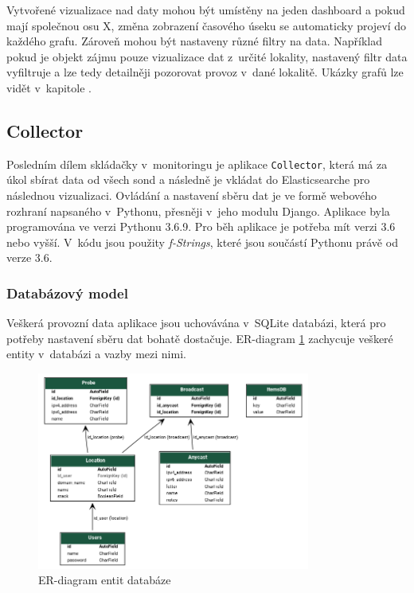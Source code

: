\documentclass[thesis=M,czech]{src/FITthesis}[2019/12/23]
\begin{document}
Vytvořené vizualizace nad daty mohou být umístěny na jeden dashboard a pokud mají společnou osu X, změna zobrazení časového úseku se automaticky projeví do každého grafu. Zároveň mohou být nastaveny různé filtry na data. Například pokud je objekt zájmu pouze vizualizace dat z~určité lokality, nastavený filtr data vyfiltruje a lze tedy detailněji pozorovat provoz v~dané lokalitě. Ukázky grafů lze vidět v~kapitole .


\subsection{Collector}
Posledním dílem skládačky v~monitoringu je aplikace \texttt{Collector}, která má za úkol sbírat data od všech sond a následně je vkládat do Elasticsearche pro následnou vizualizaci. Ovládání a nastavení sběru dat je ve formě webového rozhraní napsaného v~Pythonu, přesněji v~jeho modulu Django. Aplikace byla programována ve verzi Pythonu 3.6.9. Pro běh aplikace je potřeba mít verzi 3.6 nebo vyšší. V~kódu jsou použity \textit{f-Strings}, které jsou součástí Pythonu právě od verze 3.6. 	
\subsubsection{Databázový model}
Veškerá provozní data aplikace jsou uchovávána v~SQLite databázi, která pro potřeby nastavení sběru dat bohatě dostačuje. ER-diagram \ref{fig:collector_database} zachycuje veškeré entity v~databázi a vazby mezi nimi.

\begin{figure}[ht]
  \centering
   \includegraphics[width=0.8\textwidth]{images/dns_collector_model.png}
   \caption{ER-diagram entit databáze}
     \label{fig:collector_database}
\end{figure} 
\end{document}

